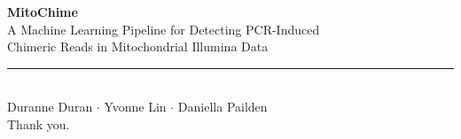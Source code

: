 \documentclass[aspectratio=169,11pt]{beamer}
\newcommand{\presenters}{Duranne Duran \quad $\cdot$ \quad Yvonne Lin \quad $\cdot$ \quad Daniella Pailden}
\begin{document}
{
\begin{frame}[plain]
\vspace{1.2cm}

\begin{center}
{\Huge \textbf{MitoChime}}\\[0.7em]

{\large A Machine Learning Pipeline for Detecting PCR-Induced}\\
{\large Chimeric Reads in Mitochondrial Illumina Data}\\[1.5em]

\rule{0.65\linewidth}{0.5pt}\\[1.2em]

{\normalsize
\presenters
}\\[1.5em]

{\large Thank you.}
\end{center}

\end{frame}
}


\appendix
\end{document}
